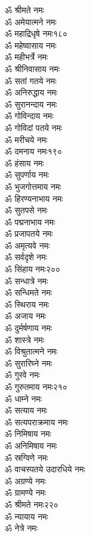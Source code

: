 \begin{multicols}{2}
\begin{flushleft}
ॐ श्रीमते नमः\\
ॐ अमेयात्मने नमः\\
ॐ महाद्रिधृषे नमः\hfill १८०\\
ॐ महेष्वासाय नमः\\
ॐ महीभर्त्रे नमः\\
ॐ श्रीनिवासाय नमः\\
ॐ सतां गतये नमः\\
ॐ अनिरुद्धाय नमः\\
ॐ सुरानन्दाय नमः\\
ॐ गोविन्दाय नमः\\
ॐ गोविदां पतये नमः\\
ॐ मरीचये नमः\\
ॐ दमनाय नमः\hfill १९०\\
ॐ हंसाय नमः\\
ॐ सुपर्णाय नमः\\
ॐ भुजगोत्तमाय नमः\\
ॐ हिरण्यनाभाय नमः\\
ॐ सुतपसे नमः\\
ॐ पद्मनाभाय नमः\\
ॐ प्रजापतये नमः\\
ॐ अमृत्यवे नमः\\
ॐ सर्वदृशे नमः\\
ॐ सिंहाय नमः\hfill २००\\
ॐ सन्धात्रे नमः\\
ॐ सन्धिमते नमः\\
ॐ स्थिराय नमः\\
ॐ अजाय नमः\\
ॐ दुर्मर्षणाय नमः\\
ॐ शास्त्रे नमः\\
ॐ विश्रुतात्मने नमः\\
ॐ सुरारिघ्ने नमः\\
ॐ गुरवे नमः\\
ॐ गुरुतमाय नमः\hfill २१०\\
ॐ धाम्ने नमः\\
ॐ सत्याय नमः\\
ॐ सत्यपराक्रमाय नमः\\
ॐ निमिषाय नमः\\
ॐ अनिमिषाय नमः\\
ॐ स्रग्विणे नमः\\
ॐ वाचस्पतये उदारधिये नमः\\
ॐ अग्रण्ये नमः\\
ॐ ग्रामण्ये नमः\\
ॐ श्रीमते नमः\hfill २२०\\
ॐ न्यायाय नमः\\
ॐ नेत्रे नमः\\

\end{flushleft}
\end{multicols}
